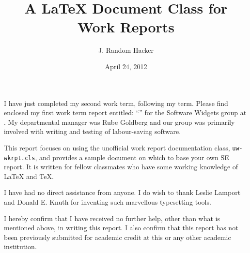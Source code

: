 \documentclass{uw-wkrpt}
\begin{document}

\title{A \LaTeX{} Document Class for Work Reports}

\author{J. Random Hacker}


\address{123 University Ave. W.\\*
         Waterloo, ON\ \ N2L 3G1}






\date{April 24, 2012}

\maketitle

\clearpage
\onehalfspacing

\begin{letter}
I have just completed my second work term, following my \theterm{} term.
Please find enclosed my first work term report entitled:
``\thetitle'' for the Software Widgets group at \theemployer.
My departmental manager was Rube Goldberg
and our group was primarily involved with writing and testing
of labour-saving software.

This report focuses on using the unofficial work report
documentation class, \texttt{uw-wkrpt.cls}, and provides a
sample document on which to base your own SE report.  It is written for
fellow classmates who have some working knowledge of \LaTeX{} and \TeX{}.

I have had no direct assistance from anyone.  I do wish to thank Leslie
Lamport and Donald E. Knuth for inventing such marvellous typesetting
tools.

I hereby confirm that I have received no further help, other than what is
mentioned above, in writing this report. I also confirm that this report has not
been previously submitted for academic credit at this or any other academic
institution.

\end{letter}
\end{document}
